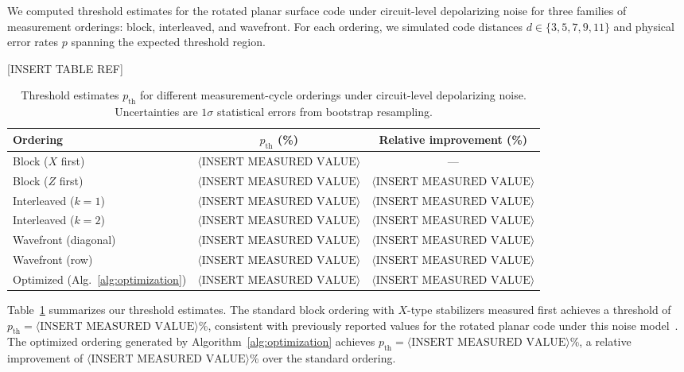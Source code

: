 \documentclass[
    reprint,
    aps,
    prx,
    superscriptaddress,
    longbibliography
]{revtex4-2}
\begin{document}
We computed threshold estimates for the rotated planar surface code under circuit-level depolarizing noise for three families of measurement orderings: block, interleaved, and wavefront. For each ordering, we simulated code distances $d \in \{3, 5, 7, 9, 11\}$ and physical error rates $p$ spanning the expected threshold region.

[INSERT TABLE REF]

\begin{table}[t]
\centering
\caption{Threshold estimates $p_{\text{th}}$ for different measurement-cycle orderings under circuit-level depolarizing noise. Uncertainties are $1\sigma$ statistical errors from bootstrap resampling.}
\label{tab:thresholds}
\begin{tabular}{lcc}
\hline\hline
Ordering & $p_{\text{th}}$ (\%) & Relative improvement (\%) \\
\hline
Block ($X$ first) & $\langle\text{INSERT MEASURED VALUE}\rangle$ & --- \\
Block ($Z$ first) & $\langle\text{INSERT MEASURED VALUE}\rangle$ & $\langle\text{INSERT MEASURED VALUE}\rangle$ \\
Interleaved ($k=1$) & $\langle\text{INSERT MEASURED VALUE}\rangle$ & $\langle\text{INSERT MEASURED VALUE}\rangle$ \\
Interleaved ($k=2$) & $\langle\text{INSERT MEASURED VALUE}\rangle$ & $\langle\text{INSERT MEASURED VALUE}\rangle$ \\
Wavefront (diagonal) & $\langle\text{INSERT MEASURED VALUE}\rangle$ & $\langle\text{INSERT MEASURED VALUE}\rangle$ \\
Wavefront (row) & $\langle\text{INSERT MEASURED VALUE}\rangle$ & $\langle\text{INSERT MEASURED VALUE}\rangle$ \\
Optimized (Alg.~\ref{alg:optimization}) & $\langle\text{INSERT MEASURED VALUE}\rangle$ & $\langle\text{INSERT MEASURED VALUE}\rangle$ \\
\hline\hline
\end{tabular}
\end{table}

Table~\ref{tab:thresholds} summarizes our threshold estimates. The standard block ordering with $X$-type stabilizers measured first achieves a threshold of $p_{\text{th}} = \langle\text{INSERT MEASURED VALUE}\rangle$\%, consistent with previously reported values for the rotated planar code under this noise model~\cite{Fowler2012Surface, Stephens2014FaultTolerant}. The optimized ordering generated by Algorithm~\ref{alg:optimization} achieves $p_{\text{th}} = \langle\text{INSERT MEASURED VALUE}\rangle$\%, a relative improvement of $\langle\text{INSERT MEASURED VALUE}\rangle$\% over the standard ordering.
\end{document}
